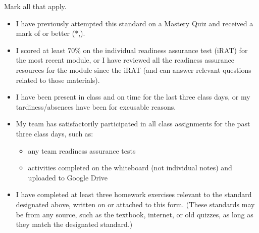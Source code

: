 \documentclass[12pt]{article}
\newcommand{\issuesMark}{{\fontencoding{U}\fontfamily{futs}\selectfont\char 66\relax}}
\begin{document}

\vspace{1em}



\renewcommand\labelitemi{\(\square\)}
Mark all that apply.
\begin{itemize}
  \item I have previously attempted this standard on a Mastery Quiz
        and received a mark of \issuesMark{} or better (\(\ast\),\checkmark{}).
  \item I scored at least 70\% on the individual readiness assurance test (iRAT)
        for the most recent module, or I have reviewed all the
        readiness assurance resources for the module since the iRAT
        (and can answer relevant questions related to those materials).
  \item I have been present in class and on time for the last three class days,
        or my tardiness/absences have been for excusable reasons.
  \item My team has satisfactorily participated in all class assignments
        for the past three class days, such as:
    \begin{itemize}
      \item any team readiness assurance tests
      \item activities completed on the whiteboard (not individual notes)
            and uploaded to Google Drive
    \end{itemize}
  \item I have completed at least three homework exercises relevant to the
        standard designated above, written on or attached to this form.
        (These standards may be from any source, such as the textbook,
        internet, or old quizzes, as long as they match the designated
        standard.)
\end{itemize}
\end{document}
